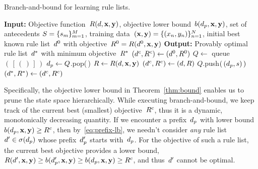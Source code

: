 \begin{algorithm}[t!]
\caption{Branch-and-bound for learning rule lists.}
\label{alg:branch-and-bound}
\begin{algorithmic}
\normalsize
\State \textbf{Input:} Objective function~$R({d}, \mathbf{x}, \mathbf{y})$,
objective lower bound~${b(d_p, \mathbf{x}, \mathbf{y})}$,
set of antecedents ${S = \{s_m\}_{m=1}^M}$,
training data~$(\mathbf{x}, \mathbf{y}) = {\{(x_n, y_n)\}_{n=1}^N}$,
initial best known rule list~$d^0$ with objective~${R^0 = R(d^0, \mathbf{x}, \mathbf{y})}$
\State \textbf{Output:} Provably optimal rule list~$d^*$ with minimum objective~$R^*$
\State $(d^c, {R^c}) \gets (d^0, R^0)$ 
\State $Q \gets $ queue$(\,[\,(\,)\,]\,)$ 
 
	\State $d_p \gets Q$.pop(\,) 
	 
        \State $R \gets R({d}, \mathbf{x}, \mathbf{y})$ 
        \If {$\Obj < \CurrentObj$}
            \State $(d^c, {R^c}) \gets ({d}, R)$ 
        \EndIf
             
                \State $Q$.push$(\,(d_p, s)\,)$ 
            \EndIf
        \EndFor
    \EndIf
\EndWhile
\State $(d^*, R^*) \gets (d^c, {R^c})$ 
\end{algorithmic}
\end{algorithm}

Specifically, the objective lower bound in Theorem~\ref{thm:bound}
enables us to prune the state space hierarchically.
%
While executing branch-and-bound, we keep track of the current best (smallest)
objective~${R^c}$, thus it is a dynamic, monotonically decreasing quantity.
%
If we encounter a prefix~$d_p$ with lower bound
${b(d_p, \mathbf{x}, \mathbf{y}) \ge {R^c}}$,
then by~\eqref{eq:prefix-lb}, we needn't consider \emph{any}
rule list~${{d}' \in \sigma(d_p)}$ whose prefix~$d_p'$ starts with~$d_p$.
%
For the objective of such a rule list, the current best objective
provides a lower bound, \ie
${R({d}', \mathbf{x}, \mathbf{y}) \ge b(d_p', \mathbf{x}, \mathbf{y}) \ge b(d_p, \mathbf{x}, \mathbf{y}) \ge {R^c}}$,
and thus~${d}'$ cannot be optimal. \\

